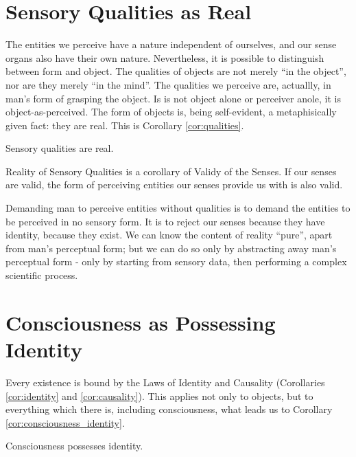     \section{Sensory Qualities as Real}
        
        The entities we perceive have a nature independent of ourselves, and our sense organs also have their own nature. Nevertheless, it is possible to distinguish between form and object. The qualities of objects are not merely ``in the object'', nor are they merely ``in the mind''. The qualities we perceive are, actuallly, in man's form of grasping the object. Is is not object alone or perceiver anole, it is object-as-perceived. The form of objects is, being self-evident, a metaphisically given fact: they are real. This is Corollary \ref{cor:qualities}.

            \begin{corollary}
            \label{cor:qualities}
                Sensory qualities are real.
            \end{corollary}

            \begin{remark}
                Reality of Sensory Qualities is a corollary of Validy of the Senses. If our senses are valid, the form of perceiving entities our senses provide us with is also valid.
            \end{remark}

        Demanding man to perceive entities without qualities is to demand the entities to be perceived in no sensory form. It is to reject our senses because they have identity, because they exist. We can know the content of reality ``pure'', apart from man's perceptual form; but we can do so only by abstracting away man's perceptual form - only by starting from sensory data, then performing a complex scientific process.
    
    \section{Consciousness as Possessing Identity}

        Every existence is bound by the Laws of Identity and Causality (Corollaries \ref{cor:identity} and \ref{cor:causality}). This applies not only to objects, but to everything which there is, including consciousness, what leads us to Corollary \ref{cor:consciousness_identity}.
        
            \begin{corollary}
            \label{cor:consciousness_identity}
                Consciousness possesses identity.
            \end{corollary}

